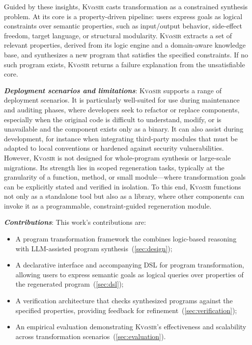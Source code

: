\documentclass[nonacm,sigplan,review]{acmart}
\newcommand{\sys}{{\scshape Kv{$\alpha$}sir}\xspace}
\newcommand{\heading}[1]{\vspace{2pt}\noindent\textbf{\emph{#1}}:\enspace}
\begin{document}
Guided by these insights, \sys casts transformation as a constrained synthesis problem.
At its core is a property-driven pipeline: users express goals as logical constraints over semantic properties, such as input/output behavior, side-effect freedom, target language, or structural modularity.
\sys extracts a set of relevant properties, derived from its logic engine and a domain-aware knowledge base, and synthesizes a new program that satisfies the specified constraints.
If no such program exists, \sys returns a failure explanation from the unsatisfiable core.

\heading{Deployment scenarios and limitations}
\sys supports a range of deployment scenarios.
It is particularly well-suited for use during maintenance and auditing phases, where developers seek to refactor or replace components, especially when the original code is difficult to understand, modify, or is unavailable and the component exists only as a binary.
It can also assist during development, for instance when integrating third-party modules that must be adapted to local conventions or hardened against security vulnerabilities.
However, \sys is not designed for whole-program synthesis or large-scale migrations.
Its strength lies in scoped regeneration tasks, typically at the granularity of a function, method, or small module---where transformation goals can be explicitly stated and verified in isolation.
To this end, \sys functions not only as a standalone tool but also as a
library, where other components can invoke it as a programmable,
constraint-guided regeneration module.


\heading{Contributions}
This work's contributions are:
\begin{itemize}
 \item A program transformation framework the combines logic-based reasoning with LLM-assisted program synthesis~(\cref{sec:design});
 \item A declarative interface and accompanying DSL for program transformation, allowing users to express semantic goals as logical queries over properties of the regenerated program~(\cref{sec:dsl});
 \item A verification architecture that checks synthesized programs against the specified properties, providing feedback for refinement~(\cref{sec:verification});
 \item An empirical evaluation demonstrating \sys's effectiveness and scalability across transformation scenarios~(\cref{sec:evaluation}).
\end{itemize}
\end{document}
